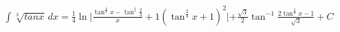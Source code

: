 \documentclass[preview]{standalone}
\begin{document}
\begin{align*}
{\int\sqrt[3]{tanx}\,dx=\frac{1}{4}\ln|\frac{\tan^{\frac{4}{3}}x-\tan^\{\frac{2}{3}}x+1}{(\tan^{\frac{2}{3}}x+1)^2}|+\frac{\sqrt3}{2}\tan^{-1}\frac{2\tan^{\frac{2}{3}}x-1}{\sqrt3}+C
\end{align*}
\end{document}

